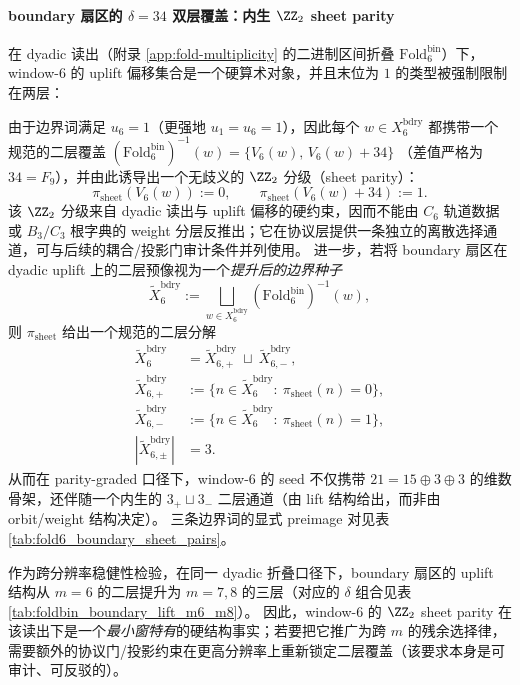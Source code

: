 \paragraph{boundary 扇区的 \texorpdfstring{$\delta=34$}{δ=34} 双层覆盖：内生 \texorpdfstring{$\ZZ_2$}{Z2} sheet parity}
在 dyadic 读出（附录 \ref{app:fold-multiplicity} 的二进制区间折叠 \(\mathrm{Fold}^{\mathrm{bin}}_6\)）下，
window-6 的 uplift 偏移集合是一个硬算术对象，并且末位为 \(1\) 的类型被强制限制在两层：

由于边界词满足 \(u_6=1\)（更强地 \(u_1=u_6=1\)），因此每个 \(w\in X_6^{\mathrm{bdry}}\) 都携带一个规范的二层覆盖
\(
(\mathrm{Fold}^{\mathrm{bin}}_6)^{-1}(w)=\{V_6(w),\,V_6(w)+34\}
\)
（差值严格为 \(34=F_9\)），并由此诱导出一个无歧义的 \(\ZZ_2\) 分级（sheet parity）：
\[
\pi_{\mathrm{sheet}}(V_6(w)):=0,\qquad \pi_{\mathrm{sheet}}(V_6(w)+34):=1.
\]
该 \(\ZZ_2\) 分级来自 dyadic 读出与 uplift 偏移的硬约束，因而不能由 \(C_6\) 轨道数据或 \(B_3/C_3\) 根字典的 weight 分层反推出；它在协议层提供一条独立的离散选择通道，可与后续的耦合/投影门审计条件并列使用。
进一步，若将 boundary 扇区在 dyadic uplift 上的二层预像视为一个\emph{提升后的边界种子}
\[
\widetilde X_6^{\mathrm{bdry}}
:=\bigsqcup_{w\in X_6^{\mathrm{bdry}}}(\mathrm{Fold}^{\mathrm{bin}}_6)^{-1}(w),
\]
则 \(\pi_{\mathrm{sheet}}\) 给出一个规范的二层分解
\[
\begin{aligned}
\widetilde X_6^{\mathrm{bdry}}&=\widetilde X^{\mathrm{bdry}}_{6,+}\ \sqcup\ \widetilde X^{\mathrm{bdry}}_{6,-},\\
\widetilde X^{\mathrm{bdry}}_{6,+}&:=\{n\in\widetilde X_6^{\mathrm{bdry}}:\ \pi_{\mathrm{sheet}}(n)=0\},\\
\widetilde X^{\mathrm{bdry}}_{6,-}&:=\{n\in\widetilde X_6^{\mathrm{bdry}}:\ \pi_{\mathrm{sheet}}(n)=1\},\\
|\widetilde X^{\mathrm{bdry}}_{6,\pm}|&=3.
\end{aligned}
\]
从而在 parity-graded 口径下，window-6 的 seed 不仅携带 \(21=15\oplus 3\oplus 3\) 的维数骨架，还伴随一个内生的 \(3_+\sqcup 3_-\) 二层通道（由 lift 结构给出，而非由 orbit/weight 结构决定）。
三条边界词的显式 preimage 对见表 \ref{tab:fold6_boundary_sheet_pairs}。

作为跨分辨率稳健性检验，在同一 dyadic 折叠口径下，boundary 扇区的 uplift 结构从 \(m=6\) 的二层提升为 \(m=7,8\) 的三层（对应的 \(\delta\) 组合见表 \ref{tab:foldbin_boundary_lift_m6_m8}）。
因此，window-6 的 \(\ZZ_2\) sheet parity 在该读出下是一个\emph{最小窗特有}的硬结构事实；若要把它推广为跨 \(m\) 的残余选择律，需要额外的协议门/投影约束在更高分辨率上重新锁定二层覆盖（该要求本身是可审计、可反驳的）。


